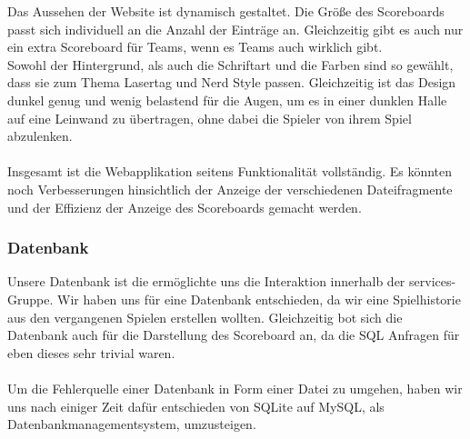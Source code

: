 Das Aussehen der Website ist  dynamisch gestaltet. Die Größe des Scoreboards passt sich individuell an die Anzahl der Einträge an. Gleichzeitig gibt es auch nur ein extra Scoreboard für Teams, wenn es Teams auch wirklich gibt.\\ Sowohl der Hintergrund, als auch die Schriftart und die Farben sind so gewählt, dass sie zum Thema Lasertag und Nerd Style passen. Gleichzeitig ist das Design dunkel genug und wenig belastend für die Augen, um es in einer dunklen Halle auf eine Leinwand zu übertragen, ohne dabei die Spieler von ihrem Spiel abzulenken. \\\\

Insgesamt ist die Webapplikation seitens Funktionalität vollständig. Es könnten noch Verbesserungen hinsichtlich der Anzeige der verschiedenen Dateifragmente und der Effizienz der Anzeige des Scoreboards gemacht werden.

\subsubsection{Datenbank}

Unsere Datenbank ist die ermöglichte uns die Interaktion innerhalb der services-Gruppe. Wir haben uns für eine Datenbank entschieden, da wir eine Spielhistorie aus den vergangenen Spielen erstellen wollten. Gleichzeitig bot sich die Datenbank auch für die Darstellung des Scoreboard an, da die SQL Anfragen für eben dieses sehr trivial waren.\\\\
Um die Fehlerquelle einer Datenbank in Form einer Datei zu umgehen, haben wir uns nach einiger Zeit dafür entschieden von SQLite auf MySQL, als Datenbankmanagementsystem, umzusteigen.\\\\


